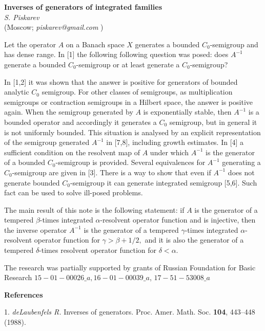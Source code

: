 \begin{center}{ \bf  Inverses of generators of integrated families}\\
{\it S. Piskarev } \\
(Moscow; {\it piskarev@gmail.com} )
\end{center}


Let the operator $A$ on a Banach space $X$ generates a bounded $C_0$-semigroup
and has dense range. In [1] the following following question was posed: does
$A^{-1}$ generate a bounded $C_0$-semigroup or at least generate a $C_0$-semigroup?

In [1,2] it was shown  that the answer is positive for generators of bounded
analytic $C_0$ semigroup.  For other classes of semigroups, as multiplication
semigroups or contraction semigroups in a Hilbert space, the answer is positive again.
When the semigroup generated by $A$ is exponentially stable, then $A^{-1}$ is a
bounded operator and accordingly it generates a  $C_0$ semigroup, but in general
it is not uniformly bounded. This situation is analysed by an explicit representation
of the semigroup generated $A^{-1}$ in [7,8], including growth estimates.
In [4] a sufficient condition on the resolvent map of $A$ under which $A^{-1}$
is the generator of a bounded  $C_0$-semigroup is provided. Several equivalences
for $A^{-1}$ generating a $C_0$-semigroup are given in [3]. There is a way to
show that even if $A^{-1}$ does not generate bounded $C_0$-semigroup it can generate
integrated semigroup [5,6]. Such fact can be used to solve ill-posed problems.

The main result of this note is  the following statement: if $A$ is the generator
of a tempered $\beta$-times integrated $\alpha$-resolvent operator function and
is injective, then the inverse operator $A^{-1}$ is the generator of a tempered
$\gamma$-times integrated $\alpha$-resolvent operator function for
$\gamma > \beta+1/2,$ and it is also the generator of a tempered $\delta$-times
resolvent operator function for $\delta < \alpha.$


The research was partially  supported by grants of Russian Foundation
for Basic Research  $15-01-00026\_a, 16-01-00039\_a$,
 $17-51-53008{\_}a$



\smallskip \centerline{\bf References}\nopagebreak

1. {\it  deLaubenfels R.} Inverses of generators. Proc. Amer. Math. Soc. \textbf{104}, 443--448 (1988).


